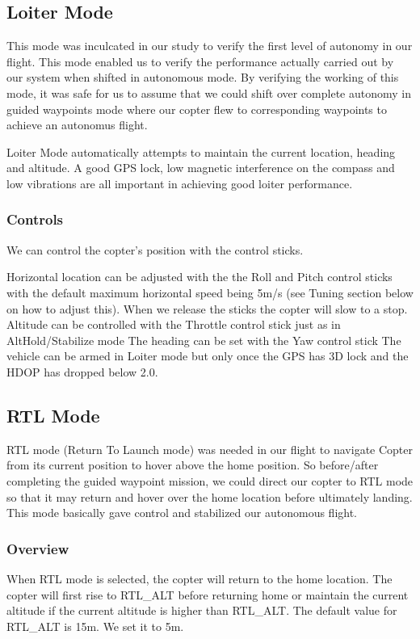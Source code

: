 \subsection{Loiter Mode}
This mode was inculcated in our study to verify the first level of autonomy in our flight. This mode enabled us to verify the performance actually carried out by our system when shifted in autonomous mode. By verifying the working of this mode, it was safe for us to assume that we could shift over complete autonomy in guided waypoints mode where our copter flew to corresponding waypoints to achieve an autonomus flight.

Loiter Mode automatically attempts to maintain the current location, heading and altitude. A good GPS lock, low magnetic interference on the compass and low vibrations are all important in achieving good loiter performance.
\subsubsection{Controls}
We can control the copter’s position with the control sticks.

Horizontal location can be adjusted with the the Roll and Pitch control sticks with the default maximum horizontal speed being 5m/s (see Tuning section below on how to adjust this). When we release the sticks the copter will slow to a stop.
Altitude can be controlled with the Throttle control stick just as in AltHold/Stabilize mode
The heading can be set with the Yaw control stick
The vehicle can be armed in Loiter mode but only once the GPS has 3D lock and the HDOP has dropped below 2.0. 


\subsection{RTL Mode}
RTL mode (Return To Launch mode) was needed in our flight to navigate Copter from its current position to hover above the home position. So before/after completing the guided waypoint mission, we could direct our copter to RTL mode so that it may return and hover over the home location before ultimately landing. This mode basically gave control and stabilized our autonomous flight.
\subsubsection{Overview}
When RTL mode is selected, the copter will return to the home location. The copter will first rise to RTL\_ALT before returning home or maintain the current altitude if the current altitude is higher than RTL\_ALT. The default value for RTL\_ALT is 15m. We set it to 5m.

